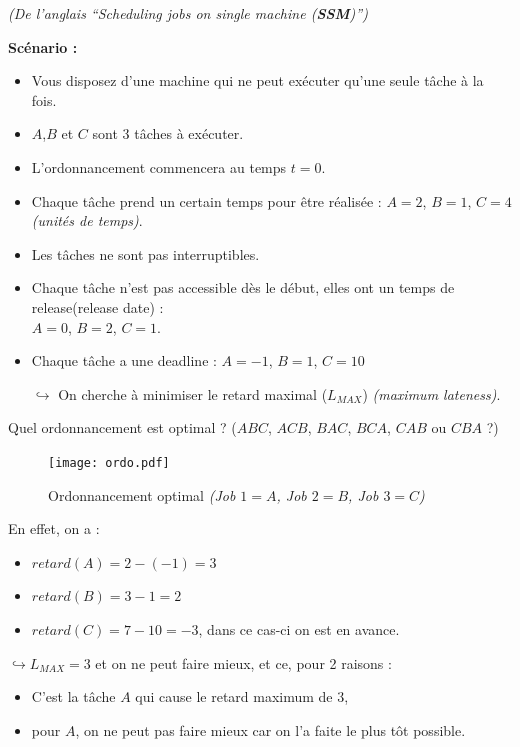 \documentclass[12pt]{article}
\begin{document}
\begin{flushright}
\textit{(De l'anglais ``Scheduling jobs on single machine (\textbf{SSM})'')}
\end{flushright}
\textbf{Scénario :}
\begin{itemize}
\item Vous disposez d'une machine qui ne peut exécuter qu'une seule tâche à la
fois.
\item $A$,$B$ et $C$ sont $3$ tâches à exécuter.
\item L'ordonnancement commencera au temps $t = 0$.
\item Chaque tâche prend un certain temps pour être réalisée : $A = 2$, $B = 1$,
$C = 4$ \textit{(unités de temps)}.
\item Les tâches ne sont pas interruptibles.
\item Chaque tâche n'est pas accessible dès le début, elles ont un temps de
release(release date) :\\ $A = 0$, $B = 2$, $C = 1$.
\item Chaque tâche a une deadline : $A = -1$, $B = 1$, $C = 10$
\item[$\hookrightarrow$] On cherche à minimiser le retard maximal ($L_{MAX}$)
\textit{(maximum lateness)}.
\end{itemize}

Quel ordonnancement est optimal ? ($ABC$, $ACB$, $BAC$, $BCA$, $CAB$ ou $CBA$ ?)

\begin{figure}[H]
    \begin{center}
    \texttt{[image: ordo.pdf]}
    \caption{Ordonnancement optimal \textit{(Job $1 = A$, Job $2 = B$,
    Job $3 = C$)}}
    \end{center}
\end{figure}
\noindent En effet, on a :
\begin{itemize}
\item $retard(A) = 2 - (-1) = 3$
\item $retard(B) = 3 - 1 = 2$
\item $retard(C) = 7 - 10 = -3$, dans ce cas-ci on est en avance.
\end{itemize}

$\hookrightarrow L_{MAX} = 3$ et on ne peut faire mieux, et ce, pour 2 raisons :
\begin{itemize}
\item C'est la tâche $A$ qui cause le retard maximum de $3$,
\item pour $A$, on ne peut pas faire mieux car on l'a faite le plus tôt
possible.
\end{itemize}
\end{document}
